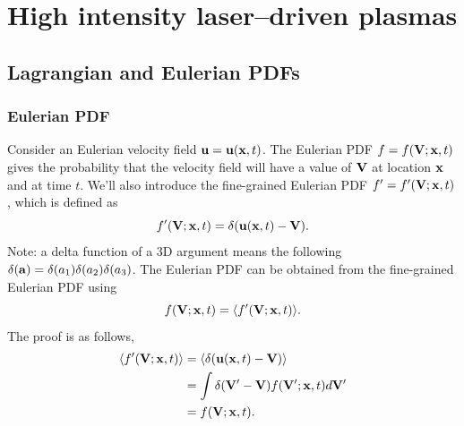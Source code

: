 \documentclass[a4paper,11pt]{report}
\begin{document}
\part{High intensity laser--driven plasmas}

\appendix

\chapter{Lagrangian and Eulerian PDFs}

\section{Eulerian PDF}
Consider an Eulerian velocity field $\mathbf{u} = \mathbf{u}(\mathbf{x},t)$. The Eulerian PDF $f = f(\mathbf{V}; \mathbf{x},t)$ gives the probability that the velocity field will have a value of $\mathbf{V}$ at location $\mathbf{x}$ and at time $t$. We'll also introduce the fine-grained Eulerian PDF $f' = f'(\mathbf{V};\mathbf{x},t)$, which is defined as 
\begin{equation}
    f'(\mathbf{V}; \mathbf{x}, t) = \delta(\mathbf{u}(\mathbf{x},t) - \mathbf{V}).
\end{equation}
Note: a delta function of a 3D argument means the following $\delta(\mathbf{a}) = \delta(a_1) \delta(a_2) \delta(a_3) $. The Eulerian PDF can be obtained from the fine-grained Eulerian PDF using 
\begin{equation}
    \label{eq:fine_eul_pdf}
    f(\mathbf{V}; \mathbf{x}, t)=\langle f'(\mathbf{V}; \mathbf{x}, t) \rangle.
\end{equation}
The proof is as follows,
\begin{align}
    \langle f'(\mathbf{V}; \mathbf{x}, t) \rangle &= \langle \delta( \mathbf{u}(\mathbf{x},t) - \mathbf{V}) \rangle \nonumber \\
    &= \int \delta( \mathbf{V}' - \mathbf{V}) f(\mathbf{V}';\mathbf{x},t) d\mathbf{V}' \nonumber \\
    &= f(\mathbf{V}; \mathbf{x}, t).
\end{align}
\end{document}
